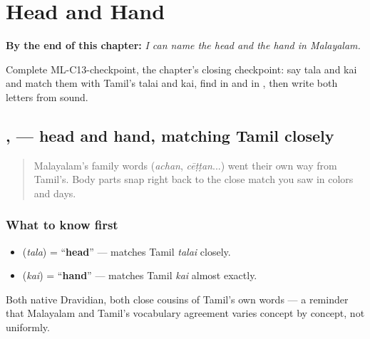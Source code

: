 
\chapter{Head and Hand}
\label{ch:ml-head-and-hand}

\begin{chapteropening}
\textbf{By the end of this chapter:} \emph{I can name the head and the hand in Malayalam.}

Complete ML-C13-checkpoint, the chapter's closing checkpoint: say tala and kai and match them with Tamil's talai and kai, find  in  and  in , then write both letters from sound.
\end{chapteropening}

\section[\texorpdfstring{\ml{തല} \ml{കൈ} (tala kai)}{തല കൈ (tala kai)}]{,  — head and hand, matching Tamil closely}

\label{lesson:ML-C13-shareera-bhaagangal}



\begin{quote}
Malayalam's family words (\emph{achan}, \emph{cēṭṭan}...) went their own way from Tamil's. Body parts snap right back to the close match you saw in colors and days.
\end{quote}

\subsection*{What to know first}
\begin{itemize}
\raggedright
  \item \textbf{} (\emph{tala}) = \textquotedblleft{}\textbf{head}\textquotedblright{} — matches Tamil \emph{talai} closely.
  \item \textbf{} (\emph{kai}) = \textquotedblleft{}\textbf{hand}\textquotedblright{} — matches Tamil \emph{kai} almost exactly.
\end{itemize}

Both native Dravidian, both close cousins of Tamil's own words — a reminder that Malayalam and Tamil's vocabulary agreement varies concept by concept, not uniformly.

